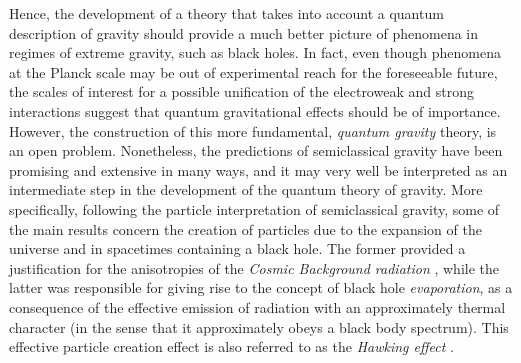 \documentclass[
12pt,		%
openright,	%
twoside,  %
a4paper,			%
chapter=TITLE,		%
english,			%
french,				%
spanish,			%
brazil				%
]{USPSC-classe/USPSC}
\begin{document}
Hence, the development of a theory that takes into account a quantum description of gravity should provide a much better picture of phenomena in regimes of extreme gravity, such as black holes. In fact, even though phenomena at the Planck scale may be out of experimental reach for the foreseeable future, the scales of interest for a possible unification of the electroweak and strong interactions suggest that quantum gravitational effects should be of importance. However, the construction of this more fundamental, \textit{quantum gravity} theory, is an open problem. Nonetheless, the predictions of semiclassical gravity have been promising and extensive in many ways, and it may very well be interpreted as an intermediate step in the development of the quantum theory of gravity. More specifically, following the particle interpretation of semiclassical gravity, some of the main results concern the creation of particles due to the expansion of the universe and in spacetimes containing a black hole. The former provided a justification for the anisotropies of the \textit{Cosmic Background radiation} \cite{Parker2009}, while the latter was responsible for giving rise to the concept of black hole \textit{evaporation}, as a consequence of the effective emission of radiation with an approximately thermal character (in the sense that it approximately obeys a black body spectrum). This effective particle creation effect is also referred to as the \textit{Hawking effect} \cite{Hawking1974, Hawking1975}.
\end{document}
